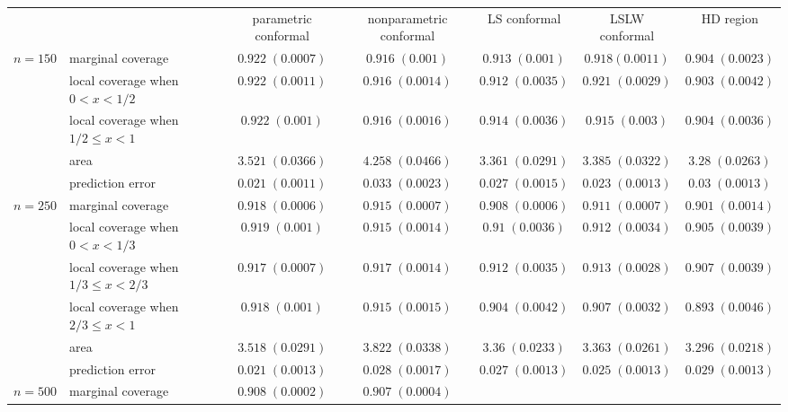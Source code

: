 \documentclass[11pt]{article}\usepackage[]{graphicx}\usepackage[]{color}
\begin{document}
\begin{table}[h!]
\tiny
\begin{center}
\begin{tabular}{llccccc}
  & & parametric conformal & nonparametric conformal & LS conformal & 
    LSLW conformal & HD region \\ 
  $n = 150$
    & marginal coverage &
  $0.922 \; (0.0007)$ & 
  $0.916 \; (0.001)$ & 
  $0.913 \; (0.001)$ & 
  $0.918  (0.0011)$ & 
  $0.904 \; (0.0023)$ \\
    & local coverage when $0 < x < 1/2$ & 
  $0.922 \; (0.0011)$ & 
  $0.916 \; (0.0014)$ & 
  $0.912 \; (0.0035)$ & 
  $0.921 \; (0.0029)$ & 
  $0.903 \; (0.0042)$ \\
    & local coverage when $1/2 \leq x < 1$ & 
  $0.922 \; (0.001)$ & 
  $0.916 \; (0.0016)$ & 
  $0.914 \; (0.0036)$ & 
  $0.915 \; (0.003)$ & 
  $0.904 \; (0.0036)$ \\
    & area &
  $3.521 \; (0.0366)$ & 
  $4.258 \; (0.0466)$ & 
  $3.361 \; (0.0291)$ & 
  $3.385 \; (0.0322)$ & 
  $3.28 \; (0.0263)$ \\
    & prediction error &
  $0.021 \; (0.0011)$ & 
  $0.033 \; (0.0023)$ & 
  $0.027 \; (0.0015)$ & 
  $0.023 \; (0.0013)$ & 
  $0.03 \; (0.0013)$ \\
  \hline
  $n = 250$  
    & marginal coverage &
  $0.918 \; (0.0006)$ & 
  $0.915 \; (0.0007)$ & 
  $0.908 \; (0.0006)$ & 
  $0.911 \; (0.0007)$ & 
  $0.901 \; (0.0014)$ \\
    & local coverage when $0 < x < 1/3$ & 
  $0.919 \; (0.001)$ & 
  $0.915 \; (0.0014)$ & 
  $0.91 \; (0.0036)$ & 
  $0.912 \; (0.0034)$ & 
  $0.905 \; (0.0039)$ \\
    & local coverage when $1/3 \leq x < 2/3$ & 
  $0.917 \; (0.0007)$ & 
  $0.917 \; (0.0014)$ & 
  $0.912 \; (0.0035)$ & 
  $0.913 \; (0.0028)$ & 
  $0.907 \; (0.0039)$ \\
    & local coverage when $2/3 \leq x < 1$ &
  $0.918 \; (0.001)$ & 
  $0.915 \; (0.0015)$ & 
  $0.904 \; (0.0042)$ & 
  $0.907 \; (0.0032)$ & 
  $0.893 \; (0.0046)$ \\
    & area & 
  $3.518 \; (0.0291)$ & 
  $3.822 \; (0.0338)$ & 
  $3.36 \; (0.0233)$ & 
  $3.363 \; (0.0261)$ & 
  $3.296 \; (0.0218)$ \\
    & prediction error & 
  $0.021 \; (0.0013)$ & 
  $0.028 \; (0.0017)$ & 
  $0.027 \; (0.0013)$ & 
  $0.025 \; (0.0013)$ & 
  $0.029 \; (0.0013)$ \\
  \hline
  $n = 500$
    & marginal coverage & 
  $0.908 \; (0.0002)$ & 
  $0.907 \; (0.0004)$ & 

\end{tabular}
\end{center}
\end{table}
\end{document}
